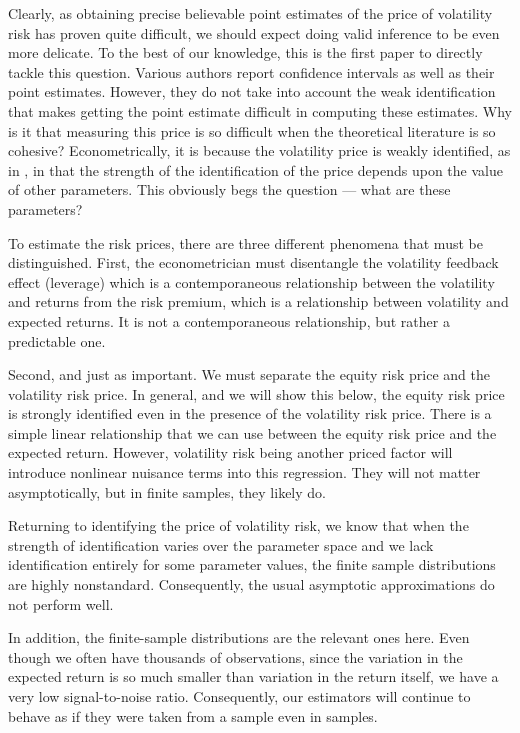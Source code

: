 \documentclass[11pt, letterpaper, twoside]{article}
\begin{document}
Clearly, as obtaining precise believable point estimates of the price of volatility risk has proven quite difficult, we should expect doing valid inference to be even more delicate. To the best of our knowledge, this is the first paper to directly tackle this question. Various authors report confidence intervals as well as their point estimates. However, they do not take into account the weak identification that makes getting the point estimate difficult in computing these estimates. Why is it that measuring this price is so difficult when the theoretical literature is so cohesive? Econometrically, it is because the volatility price is weakly identified, as in \textcite{andrews2012estimation}, in that the strength of the identification of the price depends upon the value of other parameters. This obviously begs the question --- what are these parameters? 

To estimate the risk prices, there are three different phenomena that must be distinguished. First, the econometrician must disentangle the volatility feedback effect (leverage) which is a contemporaneous relationship between the volatility and returns from the risk premium, which is a relationship between volatility and expected returns. It is not a contemporaneous relationship, but rather a predictable one. 

Second, and just as important. We must separate the equity risk price and the volatility risk price. In general, and we will show this below, the equity risk price is strongly identified even in the presence of the volatility risk price. There is a simple linear relationship that we can use between the equity risk price and the expected return. However, volatility risk being another priced factor will introduce nonlinear nuisance terms into this regression. They will not matter asymptotically, but in finite samples, they likely do.

Returning to identifying the price of volatility risk, we know that when the strength of identification varies over the parameter space and we lack identification entirely for some parameter values, the finite sample distributions are highly nonstandard. Consequently, the usual asymptotic  approximations do not perform well. 

In addition, the finite-sample distributions are the relevant ones here. Even though we often have thousands of observations, since the variation in the expected return is so much smaller than variation in the return itself, we have a very low signal-to-noise ratio. Consequently, our estimators will continue to behave as if they were taken from a  sample even in  samples.
\end{document}
